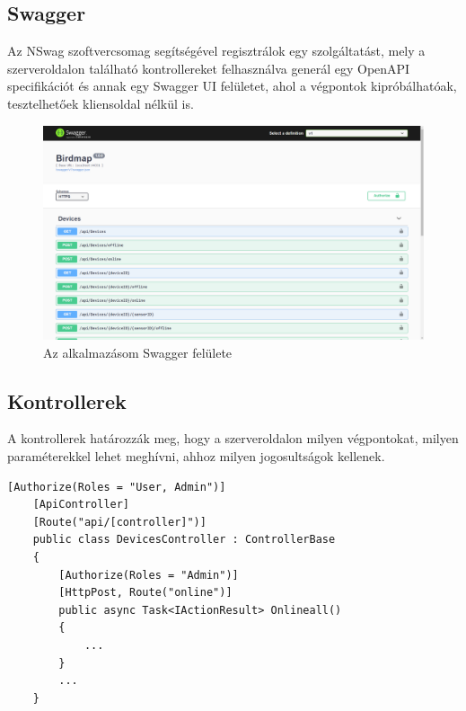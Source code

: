 \subsection{Swagger}
\label{subsect:backend-swagger}
Az NSwag\cite{nswag} szoftvercsomag segítségével regisztrálok egy szolgáltatást, 
mely a szerveroldalon található kontrollereket felhasználva generál egy OpenAPI specifikációt és annak egy Swagger UI\cite{swagger-ui} felületet,
ahol a végpontok kipróbálhatóak, tesztelhetőek kliensoldal nélkül is.

\begin{figure}[!ht]
    \centering
    \includegraphics[width=150mm, keepaspectratio]{figures/swagger-ui.png}
    \caption{Az alkalmazásom Swagger felülete}
    \label{fig:swagger-ui}
\end{figure}

\subsection{Kontrollerek}
A kontrollerek határozzák meg, hogy a szerveroldalon milyen végpontokat, milyen paraméterekkel lehet meghívni, ahhoz milyen jogosultságok kellenek.

\begin{lstlisting}[style=csharp, caption=Az eszköz kontroller és annak "online" végpontja, label=lst:devices-controller]
    [Authorize(Roles = "User, Admin")]
    [ApiController]
    [Route("api/[controller]")]
    public class DevicesController : ControllerBase
    {
        [Authorize(Roles = "Admin")]
        [HttpPost, Route("online")]
        public async Task<IActionResult> Onlineall()
        {
            ...
        }
        ...
    }
\end{lstlisting}

